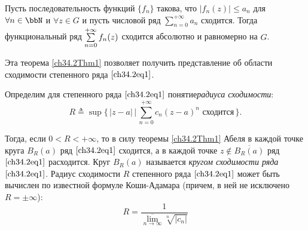 \begin{stt}
Пусть последовательность функций $\{f_n\}$ такова, что $|f_n(z)| \le a_n$ для $\forall n \in \bbN$ и $\forall z \in G$ и пусть числовой ряд $\sum\limits_{n = 0}^{+\infty} a_n$ сходится. Тогда функциональный ряд $\sum_{n = 0}^{+\infty}\limits f_n(z)$ сходится абсолютно и равномерно на $G$. 
\end{stt}

Эта теорема \ref{ch34.2Thm1} позволяет получить представление об области сходимости степенного ряда $\eqref{ch34.2eq1}$.

Определим для степенного ряда $\eqref{ch34.2eq1}$ понятие\textit{радиуса сходимости}:
\begin{equation} \label{ch34.2eq2}
R \triangleq \sup \{\, |z - a| \,\big|\, \sum_{n = 0}^{+\infty} c_n (z - a)^n \text{ сходится} \,\}.
\end{equation}

Тогда, если $0 < R < +\infty$, то в силу теоремы \ref{ch34.2Thm1} Абеля в каждой точке круга $B_R(a)$ ряд $\eqref{ch34.2eq1}$ сходится, а в каждой точке $z \notin \overline{B_R(a)}$ ряд $\eqref{ch34.2eq1}$ расходится. Круг $B_R(a)$ называется \textit{кругом сходимости ряда} $\eqref{ch34.2eq1}$.
Радиус сходимости $R$ степенного ряда $\eqref{ch34.2eq1}$ может быть вычислен по известной формуле Коши-Адамара (причем, в ней не исключено $R=\pm\infty$):
\begin{equation} \label{ch34.2eq3}
R = \frac{1}{\overline{\lim\limits_{n \to \infty}} \sqrt[n]{|c_n|}}
\end{equation}

